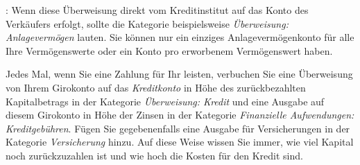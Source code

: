 \Note{}: Wenn diese Überweisung direkt vom Kreditinstitut auf das Konto des Verkäufers erfolgt, sollte die Kategorie beispielsweise \emph{Überweisung: Anlagevermögen} lauten. Sie können nur ein einziges Anlagevermögenkonto für alle Ihre Vermögenswerte oder ein Konto pro erworbenem Vermögenswert haben.

Jedes Mal, wenn Sie eine Zahlung für Ihr  leisten, verbuchen Sie eine Überweisung von Ihrem Girokonto auf das \emph{Kreditkonto} in Höhe des zurückbezahlten Kapitalbetrags in der Kategorie \emph{Überweisung: Kredit} und eine Ausgabe auf diesem Girokonto in Höhe der Zinsen in der Kategorie \emph{Finanzielle Aufwendungen: Kreditgebühren}. Fügen Sie gegebenenfalls eine Ausgabe für Versicherungen in der Kategorie \emph{Versicherung} hinzu. Auf diese Weise wissen Sie immer, wie viel Kapital noch zurückzuzahlen ist und wie hoch die Kosten für den Kredit sind.


